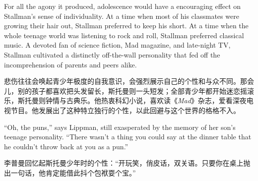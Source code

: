 \ifdefined\eng
For all the agony it produced, adolescence would have a encouraging effect on Stallman's sense of individuality. At a time when most of his classmates were growing their hair out, Stallman preferred to keep his short. At a time when the whole teenage world was listening to rock and roll, Stallman preferred classical music. A devoted fan of science fiction, Mad magazine, and late-night TV, Stallman cultivated a distinctly off-the-wall personality that fed off the incomprehension of parents and peers alike.
\fi

\ifdefined\chs
悲伤往往会唤起青少年极度的自我意识，会强烈展示自己的个性和与众不同。那会儿，别的孩子都喜欢把头发留长，斯托曼则一头短发；全部青少年都开始迷恋摇滚乐，斯托曼则钟情与古典乐。他热衷科幻小说，喜欢读《\textit{Mad}》杂志，爱看深夜电视节目。他发展出了这种特立独行的个性，以此回避与这个世界的格格不入。
\fi

\ifdefined\eng
``Oh, the puns,'' says Lippman, still exasperated by the memory of her son's teenage personality. ``There wasn't a thing you could say at the dinner table that he couldn't throw back at you as a pun.''
\fi

\ifdefined\chs
李普曼回忆起斯托曼少年时的个性：``开玩笑，俏皮话，双关语。只要你在桌上抛出一句话，他肯定能借此抖个包袱耍个宝。''
\fi

